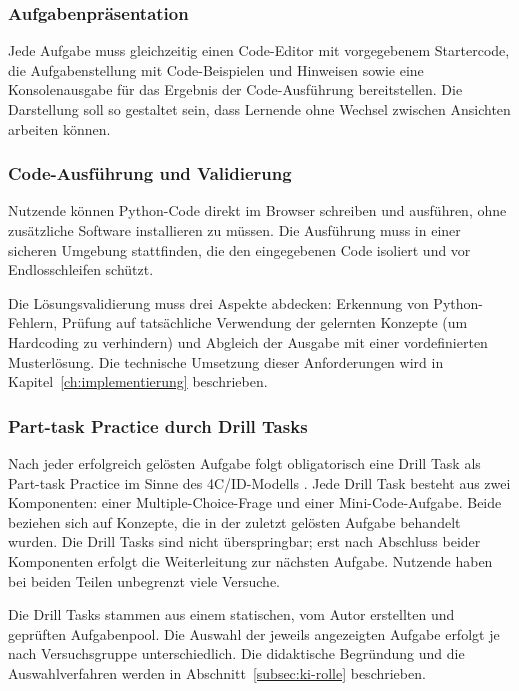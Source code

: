 \subsubsection{Aufgabenpräsentation}

Jede Aufgabe muss gleichzeitig einen Code-Editor mit vorgegebenem Startercode, die Aufgabenstellung mit Code-Beispielen und Hinweisen sowie eine Konsolenausgabe für das Ergebnis der Code-Ausführung bereitstellen.
Die Darstellung soll so gestaltet sein, dass Lernende ohne Wechsel zwischen Ansichten arbeiten können.

\subsubsection{Code-Ausführung und Validierung}

Nutzende können Python-Code direkt im Browser schreiben und ausführen, ohne zusätzliche Software installieren zu müssen.
Die Ausführung muss in einer sicheren Umgebung stattfinden, die den eingegebenen Code isoliert und vor Endlosschleifen schützt.

Die Lösungsvalidierung muss drei Aspekte abdecken: Erkennung von Python-Fehlern, Prüfung auf tatsächliche Verwendung der gelernten Konzepte (um Hardcoding zu verhindern) und Abgleich der Ausgabe mit einer vordefinierten Musterlösung.
Die technische Umsetzung dieser Anforderungen wird in Kapitel~\ref{ch:implementierung} beschrieben.

\subsubsection{Part-task Practice durch Drill Tasks}

Nach jeder erfolgreich gelösten Aufgabe folgt obligatorisch eine Drill Task als Part-task Practice im Sinne des 4C/ID-Modells \cite{vanmerrienboer2018}.
Jede Drill Task besteht aus zwei Komponenten: einer Multiple-Choice-Frage und einer Mini-Code-Aufgabe.
Beide beziehen sich auf Konzepte, die in der zuletzt gelösten Aufgabe behandelt wurden.
Die Drill Tasks sind nicht überspringbar; erst nach Abschluss beider Komponenten erfolgt die Weiterleitung zur nächsten Aufgabe.
Nutzende haben bei beiden Teilen unbegrenzt viele Versuche.

Die Drill Tasks stammen aus einem statischen, vom Autor erstellten und geprüften Aufgabenpool.
Die Auswahl der jeweils angezeigten Aufgabe erfolgt je nach Versuchsgruppe unterschiedlich. Die didaktische Begründung und die Auswahlverfahren werden in Abschnitt~\ref{subsec:ki-rolle} beschrieben.

